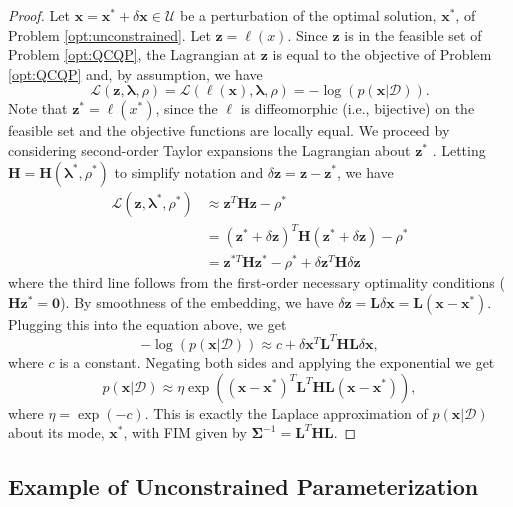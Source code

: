 \documentclass[lettersize,journal]{IEEEtran}
\begin{document}
{\begin{proof}
Let $\bm{x} = \bm{x}^*+\delta\bm{x} \in \mathcal{U}$ be a perturbation of the optimal solution, $\bm{x}^*$, of Problem \eqref{opt:unconstrained}. Let $\bm{z}= \bm{\ell}(x)$. Since $\bm{z}$ is in the feasible set of Problem \eqref{opt:QCQP}, the Lagrangian at $\bm{z}$ is equal to the objective of Problem \eqref{opt:QCQP} and, by assumption, we have
\begin{equation*}
	\mathcal{L}(\bm{z},\bm{\lambda}, \rho)=\mathcal{L}(\bm{\ell}(\bm{x}),\bm{\lambda}, \rho) = -\log(p(\bm{x} \vert \bm{\mathcal{D}})).
\end{equation*}
Note that $\bm{z}^* = \bm{\ell}(x^*)$, since the $\bm{\ell}$ is diffeomorphic (i.e., bijective) on the feasible set and the objective functions are locally equal. We proceed by considering second-order Taylor expansions the Lagrangian about $\bm{z}^*$ \cite[Theorem 12.5]{nocedalNumericalOptimization2006}. Letting  $\bm{H}= \bm{H}(\bm{\lambda}^*, \rho^*)$ to simplify notation and $\delta\bm{z} = \bm{z} - \bm{z}^*$, we have
\begin{align*}
	\mathcal{L}(\bm{z},\bm{\lambda}^*, \rho^*) &\approx \bm{z}^T \bm{H} \bm{z} - \rho^* \\ 
	&= (\bm{z}^*+\delta\bm{z})^T \bm{H} (\bm{z}^*+\delta\bm{z}) - \rho^* \\ 
	&= \bm{z}^{*T} \bm{H}\bm{z}^{*} -\rho^* + \delta\bm{z}^T \bm{H}\delta\bm{z}
\end{align*}
where the third line follows from the first-order necessary optimality conditions ($\bm{H} \bm{z}^*=\bm{0}$). By smoothness of the embedding, we have $\delta\bm{z} = \bm{L} \delta\bm{x} = \bm{L}(\bm{x}-\bm{x}^*)$. Plugging this into the equation above, we get
\begin{equation*}
	-\log(p(\bm{x} \vert \bm{\mathcal{D}})) \approx c + \delta\bm{x}^T \bm{L}^T\bm{H}\bm{L}\delta\bm{x},
\end{equation*}
where $c$ is a constant. Negating both sides and applying the exponential we get
\begin{equation*}
	p(\bm{x} \vert \bm{\mathcal{D}}) \approx \eta\exp\left((\bm{x}-\bm{x}^*)^T \bm{L}^T\bm{H}\bm{L}(\bm{x}-\bm{x}^*)\right),
\end{equation*}
where $\eta = \exp(-c)$. This is exactly the Laplace approximation of $p(\bm{x} \vert \bm{\mathcal{D}})$ about its mode, $\bm{x}^*$, with FIM given by $\bm{\Sigma}^{-1} = \bm{L}^T\bm{H}\bm{L}$.
\end{proof}

\subsection{Example of Unconstrained Parameterization}

}
\end{document}
